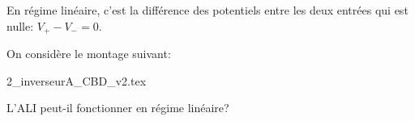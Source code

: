 
\begin{corrige}
En régime linéaire, c'est la différence des potentiels entre les deux entrées qui est nulle: $V_+-V_- = 0$.
\end{corrige}


\finEntrainement
\finalisationDuPartageDePage



\newpage




\titreEntrainementFacultatif	{}
\hauteurLargeurCadreReponse		{7mm}{4cm}
\initialisationEntrainement


\debutEntrainement

On considère le montage suivant: \vspace{-1cm}
\begin{center}
\shorthandoff{!:}
{2_inverseurA_CBD_v2.tex}
\shorthandon{!:}
\end{center}

\vspace{-5mm}


\begin{enonce}
  L’ALI peut-il fonctionner en régime linéaire?
\end{enonce}


